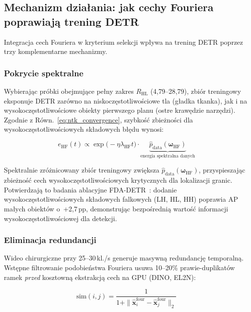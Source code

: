 \subsection{Mechanizm działania: jak cechy Fouriera poprawiają trening DETR}
\label{sec:mechanism}

Integracja cech Fouriera w kryterium selekcji wpływa na trening DETR
poprzez trzy komplementarne mechanizmy.

\subsubsection{Pokrycie spektralne}

Wybierając próbki obejmujące pełny zakres $R_{\text{HL}}$ (4{,}79--28{,}79),
zbiór treningowy eksponuje DETR zarówno na niskoczęstotliwościowe tla
(gładka tkanka), jak i na wysokoczęstotliwościowe obiekty pierwszego planu
(ostre krawędzie narzędzi).  Zgodnie z Równ.~\ref{eq:ntk_convergence},
szybkość zbieżności dla wysokoczęstotliwościowych składowych błędu wynosi:

\begin{equation}
    e_{\text{HF}}(t) \propto \exp\!\bigl(-\eta \lambda_{\text{HF}} t\bigr)
    \cdot \underbrace{\hat{p}_{\text{data}}(\boldsymbol{\omega}_{\text{HF}})}
          _{\text{energia spektralna danych}}
\end{equation}

Spektralnie zróżnicowany zbiór treningowy zwiększa
$\hat{p}_{\text{data}}(\boldsymbol{\omega}_{\text{HF}})$, przyspieszając
zbieżność cech wysokoczęstotliwościowych krytycznych dla lokalizacji granic.
Potwierdzają to badania ablacyjne FDA-DETR~\cite{fda_detr2025}: dodanie
wysokoczęstotliwościowych składowych falkowych (LH, HL, HH) poprawia AP
małych obiektów o~+2{,}7\,pp, demonstrując bezpośrednią wartość informacji
wysokoczęstotliwościowej dla detekcji.

\subsubsection{Eliminacja redundancji}

Wideo chirurgiczne przy 25--30\,kl./s generuje masywną redundancję temporalną.
Wstępne filtrowanie podobieństwa Fouriera usuwa 10--20\% prawie-duplikatów
ramek \emph{przed} kosztowną ekstrakcją cech na GPU (DINO, EL2N):

\begin{equation}
    \text{sim}(i,j) = \frac{1}{1 + \|\hat{\mathbf{x}}_i^{\text{four}}
                      - \hat{\mathbf{x}}_j^{\text{four}}\|_2}
\end{equation}


